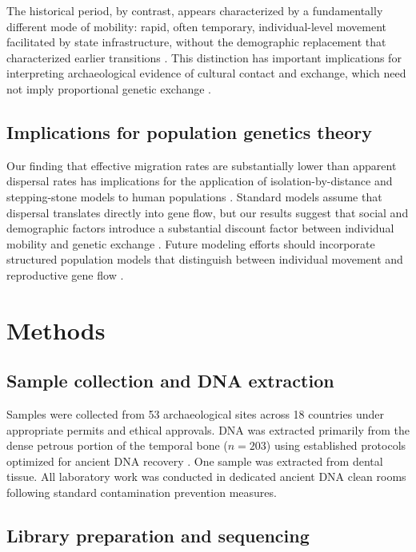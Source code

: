 \documentclass[11pt]{article}
\begin{document}
The historical period, by contrast, appears characterized by a fundamentally different mode of mobility: rapid, often temporary, individual-level movement facilitated by state infrastructure, without the demographic replacement that characterized earlier transitions \citep{Broodbank2013}. This distinction has important implications for interpreting archaeological evidence of cultural contact and exchange, which need not imply proportional genetic exchange \citep{Burmeister2000}.

\subsection{Implications for population genetics theory}

Our finding that effective migration rates are substantially lower than apparent dispersal rates has implications for the application of isolation-by-distance and stepping-stone models to human populations \citep{Wright1943,Kimura1953}. Standard models assume that dispersal translates directly into gene flow, but our results suggest that social and demographic factors introduce a substantial discount factor between individual mobility and genetic exchange \citep{Fix1999}. Future modeling efforts should incorporate structured population models that distinguish between individual movement and reproductive gene flow \citep{Wakeley2009}.

\section{Methods}

\subsection{Sample collection and DNA extraction}

Samples were collected from 53 archaeological sites across 18 countries under appropriate permits and ethical approvals. DNA was extracted primarily from the dense petrous portion of the temporal bone ($n = 203$) using established protocols optimized for ancient DNA recovery \citep{Pinhasi2015,Dabney2013}. One sample was extracted from dental tissue. All laboratory work was conducted in dedicated ancient DNA clean rooms following standard contamination prevention measures.

\subsection{Library preparation and sequencing}
\end{document}
